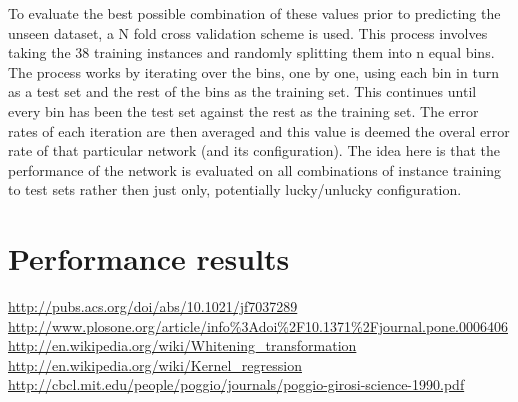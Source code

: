 \documentclass[twocolumn]{article}
\begin{document}
To evaluate the best possible combination of these values prior to predicting the unseen dataset, a N fold cross validation scheme is
used. This process involves taking the 38 training instances and randomly splitting them into n equal bins. The process works by iterating over the
bins, one by one, using each bin in turn as a test set and the rest of the bins as the training set. This continues until every bin has been
the test set against the rest as the training set. The error rates of each iteration are then averaged and this value is deemed the overal error 
rate of that particular network (and its configuration). The idea here is that the performance of the network is evaluated on all combinations
of instance training to test sets rather then just only, potentially lucky/unlucky configuration.

\section{Performance results}

\begin{thebibliography}{9}
 \url{http://pubs.acs.org/doi/abs/10.1021/jf7037289}
 \url{http://www.plosone.org/article/info%3Adoi%2F10.1371%2Fjournal.pone.0006406}
 \url{http://en.wikipedia.org/wiki/Whitening_transformation}
 \url{http://en.wikipedia.org/wiki/Kernel_regression}
 \url{http://cbcl.mit.edu/people/poggio/journals/poggio-girosi-science-1990.pdf}
\end{thebibliography}
\end{document}
